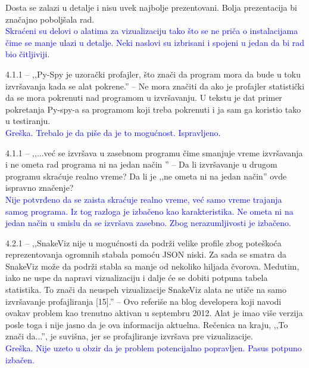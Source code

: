\documentclass[a4paper]{report}
\newcommand{\odgovor}[1]{\textcolor{blue}{#1}}
\begin{document}
Dosta se zalazi u detalje i nisu uvek najbolje prezentovani. Bolja prezentacija bi značajno poboljšala rad.\\
\odgovor{Skraćeni su delovi o alatima za vizualizaciju tako što se ne priča o instalacijama čime se manje ulazi u detalje. Neki naslovi su izbrisani i spojeni u jedan da bi rad bio čitljiviji.}

4.1.1 -- ,,Py-Spy je uzorački profajler, što znači da program mora da bude u toku izvršavanja kada se alat pokrene.'' -- Ne mora značiti da ako je profajler statistički da se mora pokrenuti nad programom u izvršavanju. U tekstu je dat primer pokretanja Py-spy-a sa programom koji treba pokrenuti i ja sam ga koristio tako u testiranju.\\
\odgovor{Greška. Trebalo je da piše da je to mogućnost. Ispravljeno.}

4.1.1 -- ,,...već se izvršava u zasebnom programu čime smanjuje vreme izvršavanja i ne ometa rad programa ni na jedan način '' -- Da li izvršavanje u drugom programu skraćuje realno vreme? Da li je ,,ne ometa ni na jedan način'' ovde ispravno značenje?\\
\odgovor{Nije potvrđeno da se zaista skraćuje realno vreme, već samo vreme trajanja samog programa. Iz tog razloga je izbačeno kao karakteristika. Ne ometa ni na jedan način u smislu da se izvršava zasebno. Zbog nerazumljivosti je izbačeno.}

4.2.1 -- ,,SnakeViz nije u mogućnosti da podrži velike profile zbog poteškoća reprezentovanja ogromnih stabala pomoću JSON niski. Za sada se smatra da SnakeViz može da podrži stabla sa manje od nekoliko hiljada čvorova. Medutim, iako ne uspe da napravi vizualizaciju i dalje će se dobiti potpuna tabela statistika. To znači da neuspeh vizualizacije SnakeViz alata ne utiče na samo izvršavanje profajliranja [15].'' -- Ovo referiše na blog developera koji navodi ovakav problem kao trenutno aktivan u septembru 2012. Alat je imao više verzija posle toga i nije jasno da je ova informacija aktuelna. Rečenica na kraju, ,,To znači da...'', je suvišna, jer se profajliranje izvršava pre vizualizacije.\\
\odgovor{Greška. Nije uzeto u obzir da je problem potencijalno popravljen. Pasus potpuno izbačen.}
\end{document}
